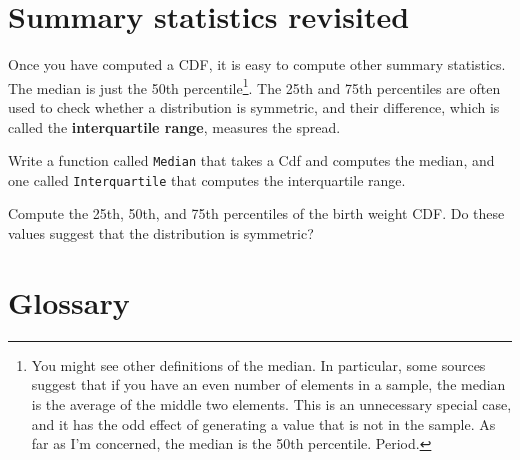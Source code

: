 \documentclass[12pt]{book}
\begin{document}
\section{Summary statistics revisited}

Once you have computed a CDF, it is easy to compute other summary
statistics.  The median is just the 50th percentile\footnote{You might
see other definitions of the median.  In particular,
some sources suggest that if you have an even number of elements in
a sample, the median is the average of the middle two elements.
This is an unnecessary special case, and it has the odd effect of
generating a value that is not in the sample.  As far
as I'm concerned, the median is the 50th percentile.  Period.}.
The 25th and 75th percentiles are often used to check whether
a distribution is symmetric, and their difference, which is called
the {\bf interquartile range}, measures the spread.

\begin{exercise}
Write a function called {\tt Median} that takes a Cdf and computes the
median, and one called {\tt Interquartile} that computes
the interquartile range.

Compute the 25th, 50th, and 75th percentiles of the birth weight
CDF.  Do these values suggest that the distribution is symmetric?

\end{exercise}


\section{Glossary}
\end{document}

